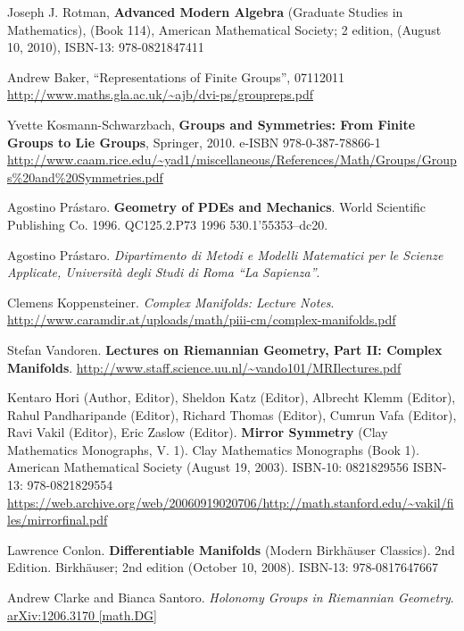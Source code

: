 \documentclass[10pt]{amsart}
\begin{document}
\begin{thebibliography}{9}
Joseph J. Rotman, \textbf{Advanced Modern Algebra} (Graduate Studies in Mathematics), (Book 114), American Mathematical Society; 2 edition, (August 10, 2010), ISBN-13: 978-0821847411

Andrew Baker, ``Representations of Finite Groups'', 07112011
\url{http://www.maths.gla.ac.uk/~ajb/dvi-ps/groupreps.pdf}

Yvette Kosmann-Schwarzbach, \textbf{Groups and Symmetries: From Finite Groups to Lie Groups}, Springer, 2010. e-ISBN 978-0-387-78866-1 \url{http://www.caam.rice.edu/~yad1/miscellaneous/References/Math/Groups/Groups\%20and\%20Symmetries.pdf}

Agostino Pr\'{a}staro.  \textbf{Geometry of PDEs and Mechanics}.  World Scientific Publishing Co.  1996.  QC125.2.P73 1996  530.1'55353--dc20.  

Agostino Pr\'{a}staro.  \emph{Dipartimento di Metodi e Modelli Matematici per le Scienze Applicate, Universit\`{a} degli Studi di Roma ``La Sapienza''}.  

  Clemens Koppensteiner.  \emph{Complex Manifolds: Lecture Notes}.  \url{http://www.caramdir.at/uploads/math/piii-cm/complex-manifolds.pdf}
  

Stefan Vandoren. \textbf{Lectures on Riemannian Geometry, Part II: Complex Manifolds}.  \url{http://www.staff.science.uu.nl/~vando101/MRIlectures.pdf} 

Kentaro Hori (Author, Editor), Sheldon Katz (Editor), Albrecht Klemm (Editor), Rahul Pandharipande (Editor), Richard Thomas (Editor), Cumrun Vafa (Editor), Ravi Vakil (Editor), Eric Zaslow (Editor).  \textbf{Mirror Symmetry} (Clay Mathematics Monographs, V. 1).  Clay Mathematics Monographs (Book 1).  American Mathematical Society (August 19, 2003).  ISBN-10: 0821829556  ISBN-13: 978-0821829554  \url{https://web.archive.org/web/20060919020706/http://math.stanford.edu/~vakil/files/mirrorfinal.pdf}

Lawrence Conlon.  \textbf{Differentiable Manifolds} (Modern Birkhäuser Classics).  2nd Edition.  Birkhäuser; 2nd edition (October 10, 2008).  ISBN-13: 978-0817647667




Andrew Clarke and Bianca Santoro.  \emph{Holonomy Groups in Riemannian Geometry}.  \href{https://arxiv.org/pdf/1206.3170.pdf}{arXiv:1206.3170 [math.DG]}


\end{thebibliography}
\end{document}
